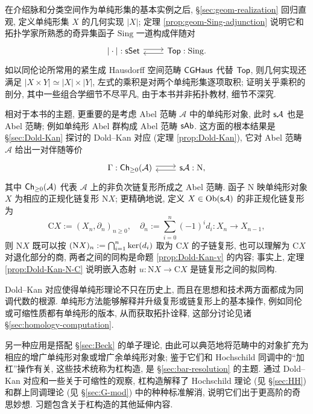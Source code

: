 在介绍脉和分类空间作为单纯形集的基本实例之后, \S\ref{sec:geom-realization} 回归直观, 定义单纯形集 $X$ 的几何实现 $|X|$; 定理 \ref{prop:geom-Sing-adjunction} 说明它和拓扑学家所熟悉的奇异集函子 $\mathrm{Sing}$ 一道构成伴随对
\[\begin{tikzcd}
	{|\cdot|}: \cate{sSet} \arrow[shift left, r] & \cate{Top} : \mathrm{Sing}. \arrow[shift left, l]
\end{tikzcd}\]
如以同伦论所常用的紧生成 Hausdorff 空间范畴 $\mathsf{CGHaus}$ 代替 $\mathsf{Top}$, 则几何实现还满足 $|X \times Y| \simeq |X| \times |Y|$, 左式的乘积是对两个单纯形集逐项取积; 证明关乎乘积的剖分, 其中一些组合学细节不尽平凡, 由于本书并非拓扑教材, 细节不深究.

相对于本书的主题, 更重要的是考虑 Abel 范畴 $\mathcal{A}$ 中的单纯形对象, 此时 $\mathsf{s}\mathcal{A}$ 也是 Abel 范畴; 例如单纯形 Abel 群构成 Abel 范畴 $\mathsf{sAb}$. 这方面的根本结果是 \S\ref{sec:Dold-Kan} 探讨的 Dold--Kan 对应 (定理 \ref{prop:Dold-Kan}), 它对 Abel 范畴 $\mathcal{A}$ 给出一对伴随等价
\[\begin{tikzcd}
	\Gamma: \cate{Ch}_{\geq 0}(\mathcal{A}) \arrow[shift left, r] & \cate{s}\mathcal{A}: \mathrm{N}, \arrow[shift left, l]
\end{tikzcd}\]
其中 $\mathsf{Ch}_{\geq 0}(\mathcal{A})$ 代表 $\mathcal{A}$ 上的非负次链复形所成之 Abel 范畴. 函子 $\mathrm{N}$ 映单纯形对象 $X$ 为相应的正规化链复形 $\mathrm{N}X$; 更精确地说, 定义 $X \in \operatorname{Ob}(\mathsf{s}\mathcal{A})$ 的非正规化链复形为
\[ \mathrm{C}X := \left( X_n, \partial_n\right)_{n \geq 0}, \quad \partial_n := \sum_{i=0}^n (-1)^i d_i : X_n \to X_{n-1}, \]
则 $\mathrm{N}X$ 既可以按 $(\mathrm{N}X)_n := \bigcap_{i=1}^n \operatorname{ker}(d_i)$ 取为 $\mathrm{C}X$ 的子链复形, 也可以理解为 $\mathrm{C}X$ 对退化部分的商, 两者之间的同构是命题 \ref{prop:Dold-Kan-v} 的内容; 事实上, 定理 \ref{prop:Dold-Kan-N-C} 说明嵌入态射 $u: \mathrm{N}X \to \mathrm{C}X$ 是链复形之间的拟同构.

Dold--Kan 对应使得单纯形理论不只在历史上, 而且在思想和技术两方面都成为同调代数的根源. 单纯形方法能够解释并升级复形或链复形上的基本操作, 例如同伦或可缩性质都有单纯形的版本, 从而获取拓扑诠释, 这部分讨论见诸 \S\ref{sec:homology-computation}.

另一种应用是搭配 \S\ref{sec:Beck} 的单子理论, 由此可以典范地将范畴中的对象扩充为相应的增广单纯形对象或增广余单纯形对象; 鉴于它们和 Hochschild 同调中的``加杠''操作有关, 这些技术统称为杠构造, 是 \S\ref{sec:bar-resolution} 的主题. 通过 Dold--Kan 对应和一些关于可缩性的观察, 杠构造解释了 Hochschild 理论 (见 \S\ref{sec:HH}) 和群上同调理论 (见 \S\ref{sec:G-mod}) 中的种种标准解消, 说明它们出于更高阶的奇思妙想. 习题包含关于杠构造的其他延伸内容.

